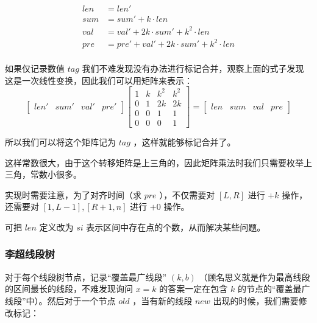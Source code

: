 \vspace{-0.4cm}

$$
\begin{aligned}
len&=len'\\
sum&=sum'+k\cdot len\\
val&=val'+2k\cdot sum'+k^2\cdot len\\
pre&=pre'+val'+2k\cdot sum'+k^2\cdot len\\
\end{aligned}
$$

\vspace{-0.2cm}

如果仅记录数值 $tag$ 我们不难发现没有办法进行标记合并，观察上面的式子发现这是一次线性变换，因此我们可以用矩阵来表示：
\vspace{-0.8cm}
$$
\begin{bmatrix}len'&sum'&val'&pre'\end{bmatrix}\begin{bmatrix}1&k&k^2&k^2\\0&1&2k&2k\\0&0&1&1\\0&0&0&1\end{bmatrix}=\begin{bmatrix}len&sum&val&pre\end{bmatrix}
$$

\vspace{-0.2cm}

所以我们可以将这个矩阵记为 $tag$ ，这样就能够标记合并了。

\newpage

这样常数很大，由于这个转移矩阵是上三角的，因此矩阵乘法时我们只需要枚举上三角，常数小很多。

实现时需要注意，为了对齐时间（求 $pre$ ），不仅需要对 $[L,R]$ 进行 $+k$ 操作，还需要对 $[1,L-1],[R+1,n]$ 进行 $+0$ 操作。

可把 $len$ 定义改为 $si$ 表示区间中存在点的个数，从而解决某些问题。



\subsubsection{李超线段树}

对于每个线段树节点，记录“覆盖最广线段” $(k,b)$ （顾名思义就是作为最高线段的区间最长的线段，不难发现询问 $x=k$ 的答案一定在包含 $k$ 的节点的“覆盖最广线段”中）。然后对于一个节点 $old$ ，当有新的线段 $new$ 出现的时候，我们需要修改标记：

